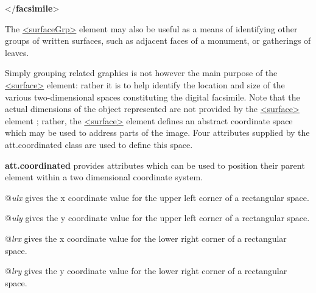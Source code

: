 \begin{shaded}
\hspace*{1em}\hspace*{1em}\mbox{}\newline 
\hspace*{1em}\mbox{}\newline 
{}\mbox{}\newline 
{</\textbf{facsimile}>}\end{shaded}\egroup\par \noindent  The \hyperref[TEI.surfaceGrp]{<surfaceGrp>} element may also be useful as a means of identifying other groups of written surfaces, such as adjacent faces of a monument, or gatherings of leaves.\par
Simply grouping related graphics is not however the main purpose of the \hyperref[TEI.surface]{<surface>} element: rather it is to help identify the location and size of the various two-dimensional spaces constituting the digital facsimile. Note that the actual dimensions of the object represented are not provided by the \hyperref[TEI.surface]{<surface>} element ; rather, the \hyperref[TEI.surface]{<surface>} element defines an abstract coordinate space which may be used to address parts of the image. Four attributes supplied by the \textsf{att.coordinated} class are used to define this space.  
\begin{sansreflist}
  
\item [\textbf{att.coordinated}] provides attributes which can be used to position their parent element within a two dimensional coordinate system.\hfil\\[-10pt]\begin{sansreflist}
    \item[@{\itshape ulx}]
  gives the x coordinate value for the upper left corner of a rectangular space.
    \item[@{\itshape uly}]
  gives the y coordinate value for the upper left corner of a rectangular space.
    \item[@{\itshape lrx}]
  gives the x coordinate value for the lower right corner of a rectangular space.
    \item[@{\itshape lry}]
  gives the y coordinate value for the lower right corner of a rectangular space.
\end{sansreflist}  
\end{sansreflist}
